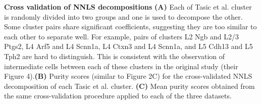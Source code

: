 \textbf{Cross validation of NNLS decompositions}
\textbf{(A)} Each of Tasic et al. cluster is randomly divided into two groups and one is used to decompose the other. Some cluster pairs share significant coefficients, suggesting they are too similar to each other to separate well. For example, pairs of clusters L2 Ngb and L2/3 Ptgs2, L4 Arf5 and L4 Scnn1a, L4 Ctxn3 and L4 Scnn1a, and L5 Cdh13 and L5 Tph2 are hard to distinguish. This is consistent with the observation of intermediate cells between each of these clusters in the original study (their Figure 4).\textbf{(B)} Purity scores (similar to Figure 2C) for the cross-validated NNLS decomposition of each Tasic et al. cluster. \textbf{(C)} Mean purity scores obtained from the same cross-validation procedure applied to each of the three datasets. 